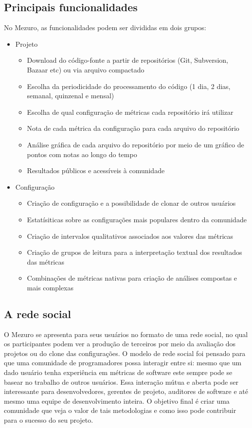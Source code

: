 \documentclass[12pt]{article}
\begin{document}
  \subsection{Principais funcionalidades}\label{sec:princ-funcionalidades}
  No Mezuro, as funcionalidades podem ser divididas em dois grupos:
  \begin{itemize}
    \item Projeto
      \begin{itemize}
      \item Download do código-fonte a partir de repositórios (Git, Subversion, Bazaar etc) ou via arquivo compactado
          \item Escolha da periodicidade do processamento do código (1 dia, 2 dias, semanal, quinzenal e mensal)
          \item Escolha de qual configuração de métricas cada repositório irá utilizar
          \item Nota de cada métrica da configuração para cada arquivo do repositório
          \item Análise gráfica de cada arquivo do repositório por meio de um gráfico de pontos com notas ao longo do tempo
          \item Resultados públicos e acessíveis à comunidade
      \end{itemize}
      \item Configuração
      \begin{itemize}
      \item Criação de configuração e a possibilidade de clonar de outros usuários
          \item Estatísiticas sobre as configurações mais populares dentro da comunidade
          \item Criação de intervalos qualitativos associados aos valores das métricas
          \item Criação de grupos de leitura para a interpretação textual dos resultados das métricas
          \item Combinações de métricas nativas para criação de análises compostas e mais complexas
      \end{itemize}
  \end{itemize}
  \subsection{A rede social}\label{sec:user-potencial}
  O Mezuro se apresenta para seus usuários no formato de uma rede social, no qual os participantes podem ver a produção de terceiros por meio da avaliação dos projetos ou do clone das configurações. O modelo de rede social foi pensado para que uma comunidade de programadores possa interagir entre si: mesmo que um dado usuário tenha experiência em métricas de software este sempre pode se basear no trabalho de outros usuários. Essa interação mútua e aberta pode ser interessante para desenvolvedores, gerentes de projeto, auditores de software e até mesmo uma equipe de desenvolvimento inteira. O objetivo final é criar uma comunidade que veja o valor de tais metodologias e como isso pode contribuir para o sucesso do seu projeto.
\end{document}
